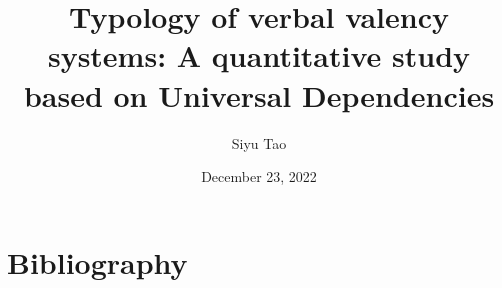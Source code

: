 \documentclass[
    paper=a4,
    paper=portrait,
    pagesize=auto,
    fontsize=11pt,
    DIV=calc, %
    ]{scrartcl}
\begin{document}
\subject{Proposal for a Master's thesis}
\title{Typology of verbal valency systems: A quantitative study based on Universal Dependencies}
\author{Siyu Tao}
\date{December 23, 2022}

\maketitle









% 

\newpage
\section*{Bibliography}
\printbibliography[heading=none]
\end{document}

